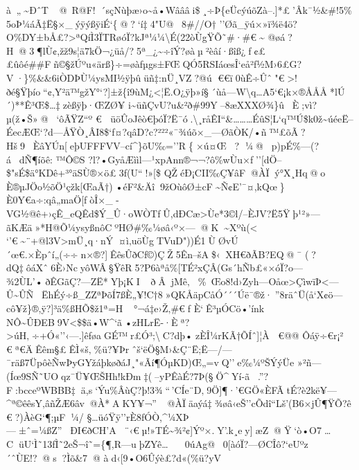 à„\textasciitilde ÐˆT@~R@F!´sçNùþæ›o\textasciitilde å•Wâââi\$¸÷Þ\{eÜcýúõZà--.{]}*£'Âk¯½\&\#!5\%5oÞ¼áÃ‡Ë§×\_ýÿýßÿiÉ`\{@ ?`í‡4"U@ 8\#//O†
''Øã\_ÿú×»ï¾ë4ö?O\%DY±bÅ£?\textgreater ªQíÌ3ÏTRøóÏ?kJª¼¼\textbackslash É(22òÙgŸÕ˜\#·\#€ \textasciitilde{}
@øá?H@ 3¶lÙ¢,žž9s¦ä7kÖ¬¿üå/?5ª\_¿\textasciitilde÷îÝ?øàµ²èâí·ßîß¿ƒ¢££ûôé\#\# Fñ©§žÚºu«ärß\}÷=øàƒµg\textquotesingle s±FŒQÓ5RSIáœsÎ`eå²f½M›6£G?V·\}\%\&\&6iÒDÞÙ¼ysMI½ÿþûüñ‡\textbar:nÜ¸V­Z?@ú
€€ï0ùÊ÷Ûˆ"€ \textgreater!ðé§Ÿþío``¢,Y²ä™gžY°`?{]}±ž\{î9ùM¿\textless¦Ë.O¿ÿþ»í§´\textbar ùå---W\textbackslash q\ldots A5`€¡k×®ÅÅÅ*lÚ´)**Ê³Œ\$\ldots‡zèßÿþ·ŒZØ¥
i\textasciitilde üñÇvU?u\&²ð\#99Y--8æXXXØ¾\}ûÈ;vì?µ(ž•Š»@ `ôÃŸZ``º € 
üöÛoJêò€þóÏ?Ë¯ó.\textbackslash¸råÊI``\&\ldots\ldots\ldots ÉûS¦L`q ™Ú\$k0ž\textasciitilde úéeË--ÉecÆŒ`?d---Å\textquotesingle Ÿ\textbar Ò¸ÂI8\$`ƒ¤?qâD?c?²²²«¯¾úõ×\_---ØãÒK/•ñ™£õÃ?Hš9ÈâYÚn{[}eþUFFFVV--cí\^{}\}õU‰=''R\{×ú¤Œ ?
¼@ p)pÉ\%---(?ádÑ¶íõê: ™­Ô©S\textquotesingle{}
?l?•GyåÆììl---¹xpAnn®¬¬?ô\%wÙu×ƒ''{[}dÖ--\$"sÉ\$ä°KDê+³°äSÙ®×ö£3f(U``!»{[}\$
QŽéÐ¡CII‰Ç¥âF@ÀÏý°X¸Hq@ o
È®µJÖo½õÖ¹çžk{[}ŒaÃ†)•éF²\&Äî9žOùôØ±cF\textasciitilde Ñ¢E'¯¤,kQœ\}È\textbar0Y€a÷:qâ„maÖ­{[}\textquotesingle ƒòÎ×\_­VG½@ê+›çÊ\_eQÊd\$Ý\_Û·oWÒTƒÛ,dÐCæ\textgreater Ùe*3©l/--ÈJV?Ë5Ÿþ¹²»---ãKÆ\textbar ä»*H@Õ¼ysyßnôCºHØ\#‰¼øâ‹º×---@ K\textasciitilde Xºù(\textless
`'€\textasciitilde¨+@l3V\textgreater mÜ¸q·nÝ¤ì‚uöÙgTVuD"))É1ÙØvÚ´œ€.×Èpˆí„(÷÷n×®?{]}ÊêsÛðCf©)ÇŽ5Ên--šA\$‹ XH€ðÃB?EQ@ ¯
(?dQ‡ôáXˆ6È›NcyôWÂ§ŸêR5?P6àªå\%{[}TÉ²xÇÂ(Gs´hÑb£«×óÏ?o---¾2ÙL'•ðÊGãÇ?---ZË*Yþ¡KIð\textquotesingleÂjMê‚ \%~Œo8!d›Zyh---Oåœ\textgreater ÇìwïÞ­\textless---Û\textasciitilde*ÛÑËhÉý÷ß\_ZZªÞõÍ7ßÈ„¥!C†8»QKÅäpCåÓ´´´Úë¯®ž·''8räˆÜ(å`X¢ö---cô¥ž\}®,ÿ?{]}³ä\%ßHÕ\$ž1ª=H°¬ á‡e›Ž‚\#€ f
È`Ê³µÓ Cö•'ínk
NÔ\textquotesingle\textasciitilde ÛÐEB9V\textless\$\$ä•W\^{}`ã•zHLrË-·Èª?\textgreater úH‚÷+\textquotesingle Ó«''‹---.{]}êføaGÉ™r£Ó³;\textbackslashC?dþ•zÈÎ¼rKÃ†ÕÍˆ{]}¦À
€@@ Ôáÿ÷€r¡²
€ ª€ÄÊêm§£ÊÌ«š‚\%ü?¥Þrˆš`ëÖ­§M›\&Ç¨Ë;Ë---/---¯räß7ÜpôèÑwÞyGYžáþkøðáJ¸"«Ãí¶ÓµKD)Œ„=vQ''e‰¼ºŠÝýÜe
»²ñ---(Íœ9SÑ˜UOqz¯Ü¥ŒŠHh!kÐm‡(--yPÊàÉ?7Þ(§Ö\^{}Yí-ã.''?F:bcceºWBBB‡ä,s `Ýu\%ÂùÇ?þ!3¾``\,'CÍe¨D‚9Ö{]}¶·'€GÖ«ÈFÃtÉ?è2kë¥---\^{}ª© êêsY‚âñ ŽÆ6âv@À*AKY¥¬''@ÀÏäaýá‡¾øâ‹eŠ''cÕdî``Lš'(B6×jÛ¶­ŸÕ?ê
€ ?)ÀèG`¶;µF ¼/
§\ldots üóŸÿ''rÈ8ƒÓÒ,\^{}¼XÞ---±ˆ=¼ßZ'' ÐI€ðC\textquotesingle H'A ¨‹€µ!»TÉ\textasciitilde¾²¢{]}Ýº×.Y'.k¸ey{]}æZ@ Ÿ`ò•O7\ldots C üU`Ì˜13fÌ˜2eŠ¬î˜=\{¶,R---uþZYê\ldots 
~ 0úAg@ 0{[}àóÏ?---ØCÎô?{}`eUºz´ˆÙE!?@ s?Ìõ\&7@ àd‹{[}9•O6Ûýè£?d«(\%ü?yV 
